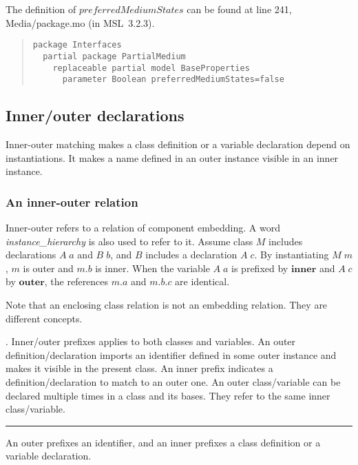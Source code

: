 \documentclass[10pt,b5paper]{article}
\newcounter{ruleno}
\def\tombstone{\rule[-.2ex]{.3em}{1.8ex}}
\newenvironment{widequote}{%
\list{}{\leftmargin=0mm\rightmargin=\leftmargin}%
\item\relax}{\endlist}
\def\rulelead{\refstepcounter{ruleno}{\bf{}Rule~\arabic{ruleno}}.}
\newenvironment{QRULE}{\begin{widequote}\rulelead}%
{\unskip\nobreakspace\tombstone\end{widequote}\ignorespacesafterend}
\begin{document}
The definition of $\mathit{preferredMediumStates}$ can be found at
line 241, Media/package.mo (in MSL~3.2.3).

\begin{quote}
\begin{lstlisting}[aboveskip=-\baselineskip]
package Interfaces
  partial package PartialMedium
    replaceable partial model BaseProperties
      parameter Boolean preferredMediumStates=false
\end{lstlisting}
\end{quote}


\subsection{Inner/outer declarations}

Inner-outer matching makes a class definition or a variable
declaration depend on instantiations.  It makes a name defined in an
outer instance visible in an inner instance.


\subsubsection*{An inner-outer relation}

Inner-outer refers to a relation of component embedding.  A word
{\it{}instance_hierarchy\/} is also used to refer to it.  Assume class
$M$ includes declarations $A\;a$ and $B\;b$, and $B$ includes a
declaration $A\;c$.  By instantiating $M\;m$, $m$ is outer and $m.b$
is inner.  When the variable $A\;a$ is prefixed by $\mathbf{inner}$
and $A\;c$ by $\mathbf{outer}$, the references $m.a$ and $m.b.c$
are identical.

Note that an enclosing class relation is not an embedding relation.
They are different concepts.

\begin{QRULE}\label{inner-outer} Inner/outer prefixes applies to both
classes and variables.  An outer definition/declaration imports an
identifier defined in some outer instance and makes it visible in the
present class.  An inner prefix indicates a definition/declaration to
match to an outer one.  An outer class/variable can be declared
multiple times in a class and its bases.  They refer to the same inner
class/variable. \end{QRULE}
An outer prefixes an identifier, and an inner prefixes a class
definition or a variable declaration.
\end{document}
